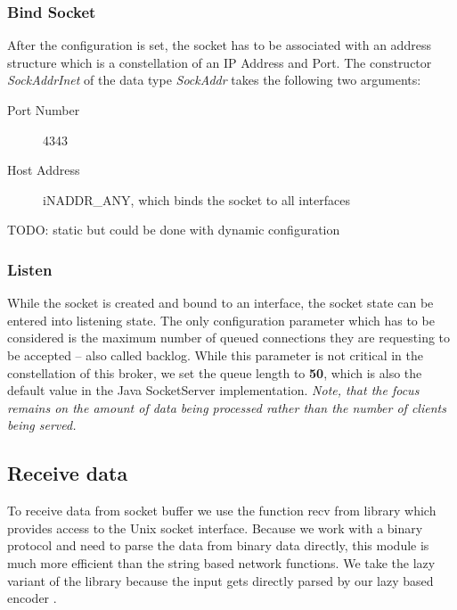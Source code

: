 \subsubsection{Bind Socket}

After the configuration is set, the socket has to be associated with an address
structure which is a constellation of an IP Address and Port. The constructor
\textit{SockAddrInet} of the data type \textit{SockAddr} takes the following
two arguments:

\begin{description}
  \item[Port Number] 4343
  \item[Host Address] iNADDR\_ANY, which binds the socket to all interfaces
\end{description}

TODO: static but could be done with dynamic configuration

\subsubsection{Listen}

While the socket is created and bound to an interface, the socket state can be
entered into listening state. The only configuration parameter which has to be
considered is the maximum number of queued connections they are requesting to
be accepted -- also called backlog. While this parameter is not critical in the
constellation of this broker, we set the queue length to \textbf{50}, which is
also the default value in the Java SocketServer implementation. \textit{Note,
that the focus remains on the amount of data being processed rather than the
number of clients being served.}

\subsection{Receive data}
\label{sec:impl-broker-socket-receive}
To receive data from socket buffer we use the function recv from
library which provides access to the Unix socket interface. Because we work
with a binary protocol and need to parse the data from binary data directly,
this module is much more efficient than the string based network functions. We
take the lazy variant of the library because the input gets directly parsed by
our lazy based encoder .

